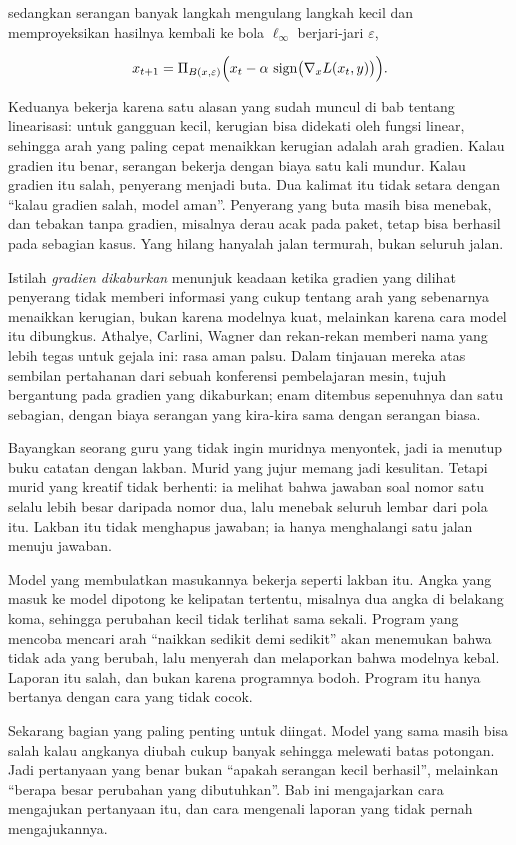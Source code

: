 sedangkan serangan banyak langkah mengulang langkah kecil dan memproyeksikan hasilnya
kembali ke bola $\ell_\infty$ berjari-jari $\varepsilon$,

\begin{equation}
x_{t+1} = \Pi_{B(x,\varepsilon)}\Bigl(x_t - \alpha\,\operatorname{sign}
\bigl(\nabla_x L(x_t,y)\bigr)\Bigr).
\end{equation}

Keduanya bekerja karena satu alasan yang sudah muncul di bab tentang linearisasi:
untuk gangguan kecil, kerugian bisa didekati oleh fungsi linear, sehingga arah yang
paling cepat menaikkan kerugian adalah arah gradien. Kalau gradien itu benar, serangan
bekerja dengan biaya satu kali mundur. Kalau gradien itu salah, penyerang menjadi buta.
Dua kalimat itu tidak setara dengan ``kalau gradien salah, model aman''. Penyerang yang
buta masih bisa menebak, dan tebakan tanpa gradien, misalnya derau acak pada paket, tetap
bisa berhasil pada sebagian kasus. Yang hilang hanyalah jalan termurah, bukan seluruh
jalan.

Istilah \emph{gradien dikaburkan} menunjuk keadaan ketika
gradien yang dilihat penyerang tidak memberi informasi yang cukup tentang arah yang
sebenarnya menaikkan kerugian, bukan karena modelnya kuat, melainkan karena cara model
itu dibungkus. Athalye, Carlini, Wagner dan rekan-rekan memberi nama yang lebih tegas
untuk gejala ini: rasa aman palsu. Dalam tinjauan mereka atas sembilan pertahanan dari
sebuah konferensi pembelajaran mesin, tujuh bergantung pada gradien yang dikaburkan;
enam ditembus sepenuhnya dan satu sebagian, dengan biaya serangan yang kira-kira sama
dengan serangan biasa.

\begin{untukanak}
Bayangkan seorang guru yang tidak ingin muridnya menyontek, jadi ia menutup buku
catatan dengan lakban. Murid yang jujur memang jadi kesulitan. Tetapi murid yang
kreatif tidak berhenti: ia melihat bahwa jawaban soal nomor satu selalu lebih besar
daripada nomor dua, lalu menebak seluruh lembar dari pola itu. Lakban itu tidak
menghapus jawaban; ia hanya menghalangi satu jalan menuju jawaban.

Model yang membulatkan masukannya bekerja seperti lakban itu. Angka yang masuk ke
model dipotong ke kelipatan tertentu, misalnya dua angka di belakang koma, sehingga
perubahan kecil tidak terlihat sama sekali. Program yang mencoba mencari arah
``naikkan sedikit demi sedikit'' akan menemukan bahwa tidak ada yang berubah, lalu
menyerah dan melaporkan bahwa modelnya kebal. Laporan itu salah, dan bukan karena
programnya bodoh. Program itu hanya bertanya dengan cara yang tidak cocok.

Sekarang bagian yang paling penting untuk diingat. Model yang sama masih bisa salah
kalau angkanya diubah cukup banyak sehingga melewati batas potongan. Jadi pertanyaan
yang benar bukan ``apakah serangan kecil berhasil'', melainkan ``berapa besar perubahan
yang dibutuhkan''. Bab ini mengajarkan cara mengajukan pertanyaan itu, dan cara mengenali
laporan yang tidak pernah mengajukannya.
\end{untukanak}

